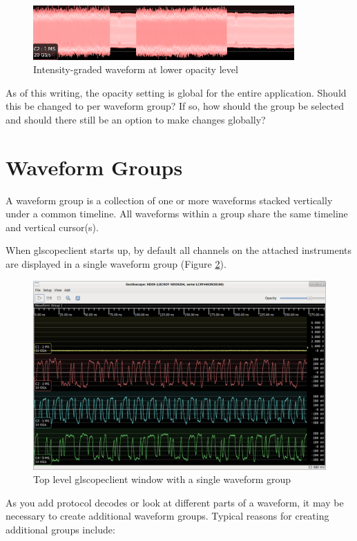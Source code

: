 \documentclass[11pt]{article}
\begin{document}
\begin{figure}[H]
\centering
\includegraphics[width=10cm]{images/graded-waveform.png}
\caption{Intensity-graded waveform at lower opacity level}
\label{graded-waveform}
\end{figure}

As of this writing, the opacity setting is global for the entire application. Should this be changed to per waveform
group? If so, how should the group be selected and should there still be an option to make changes globally?

\FloatBarrier
\pagebreak
\section{Waveform Groups}

A waveform group is a collection of one or more waveforms stacked vertically under a common timeline. All waveforms
within a group share the same timeline and vertical cursor(s).

When glscopeclient starts up, by default all channels on the attached instruments are displayed in a single waveform
group (Figure \ref{single-group}).

\begin{figure}[h]
\centering
\includegraphics[width=13cm]{images/overview.png}
\caption{Top level glscopeclient window with a single waveform group}
\label{single-group}
\end{figure}

As you add protocol decodes or look at different parts of a waveform, it may be necessary to create additional waveform
groups. Typical reasons for creating additional groups include:
\end{document}
